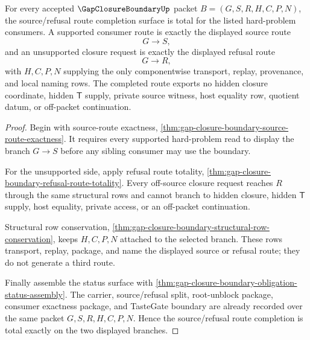 \begin{theorem}
\label{thm:gap-closure-boundary-route-completion-totality}
For every accepted $\GapClosureBoundaryUp$ packet $B=(G,S,R,H,C,P,N)$, the source/refusal route completion surface is total for the listed hard-problem consumers. A supported consumer route is exactly the displayed source route
$$
G \longrightarrow S,
$$
and an unsupported closure request is exactly the displayed refusal route
$$
G \longrightarrow R,
$$
with $H,C,P,N$ supplying the only componentwise transport, replay, provenance, and local naming rows. The completed route exports no hidden closure coordinate, hidden $\mathsf{T}$ supply, private source witness, host equality row, quotient datum, or off-packet continuation.
\end{theorem}
\begin{proof}
Begin with source-route exactness, \autoref{thm:gap-closure-boundary-source-route-exactness}. It requires every supported hard-problem read to display the branch $G \longrightarrow S$ before any sibling consumer may use the boundary.

For the unsupported side, apply refusal route totality, \autoref{thm:gap-closure-boundary-refusal-route-totality}. Every off-source closure request reaches $R$ through the same structural rows and cannot branch to hidden closure, hidden $\mathsf{T}$ supply, host equality, private access, or an off-packet continuation.

Structural row conservation, \autoref{thm:gap-closure-boundary-structural-row-conservation}, keeps $H,C,P,N$ attached to the selected branch. These rows transport, replay, package, and name the displayed source or refusal route; they do not generate a third route.

Finally assemble the status surface with \autoref{thm:gap-closure-boundary-obligation-status-assembly}. The carrier, source/refusal split, root-unblock package, consumer exactness package, and TasteGate boundary are already recorded over the same packet $G,S,R,H,C,P,N$. Hence the source/refusal route completion is total exactly on the two displayed branches.
\end{proof}
